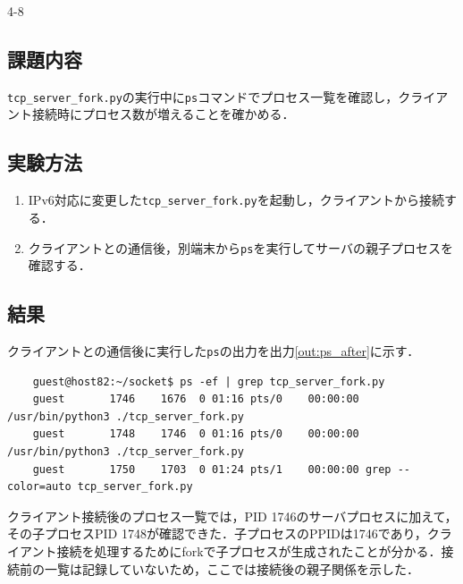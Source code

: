 \begin{maintask}{4-8}
  \subsection*{課題内容}
  \texttt{tcp\_server\_fork.py}の実行中に\texttt{ps}コマンドでプロセス一覧を確認し，クライアント接続時にプロセス数が増えることを確かめる．

  \subsection*{実験方法}
  \begin{enumerate}
    \item IPv6対応に変更した\texttt{tcp\_server\_fork.py}を起動し，クライアントから接続する．
    \item クライアントとの通信後，別端末から\texttt{ps}を実行してサーバの親子プロセスを確認する．
  \end{enumerate}

  \subsection*{結果}
  クライアントとの通信後に実行した\texttt{ps}の出力を出力\ref{out:ps_after}に示す．
  \begin{termout}[H]
    \caption{クライアント接続後のプロセス一覧}\label{out:ps_after}
    \begin{verbatim}
    guest@host82:~/socket$ ps -ef | grep tcp_server_fork.py
    guest       1746    1676  0 01:16 pts/0    00:00:00 /usr/bin/python3 ./tcp_server_fork.py
    guest       1748    1746  0 01:16 pts/0    00:00:00 /usr/bin/python3 ./tcp_server_fork.py
    guest       1750    1703  0 01:24 pts/1    00:00:00 grep --color=auto tcp_server_fork.py
    \end{verbatim}
  \end{termout}

  クライアント接続後のプロセス一覧では，PID 1746のサーバプロセスに加えて，その子プロセスPID 1748が確認できた．子プロセスのPPIDは1746であり，クライアント接続を処理するためにforkで子プロセスが生成されたことが分かる．接続前の一覧は記録していないため，ここでは接続後の親子関係を示した．
\end{maintask}
